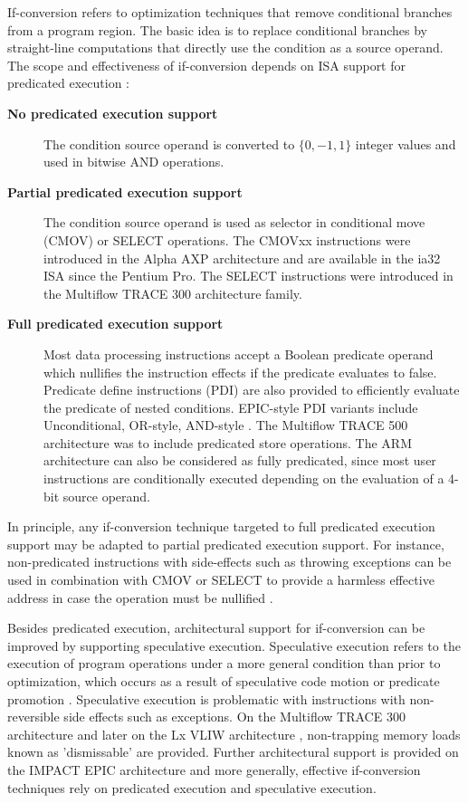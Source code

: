 If-conversion refers to optimization techniques that remove conditional branches
from a program region. The basic idea is to replace conditional branches by
straight-line computations that directly use the condition as a source operand.
The scope and effectiveness of if-conversion depends on ISA support for predicated
execution \cite{Mahlke:1995:ISCA}: \begin{description}
\item[\bf No predicated execution support] The condition source operand is converted
to $\{0, -1, 1\}$ integer values and used in bitwise AND operations.
\item[\bf Partial predicated execution support] The condition source operand is used
as selector in conditional move (CMOV) or SELECT operations. The CMOVxx
instructions were introduced in the Alpha AXP architecture
\cite{Blickstein:1992:DTJ} and are available in the ia32 ISA since the Pentium Pro.
The SELECT instructions were introduced in the Multiflow TRACE 300 architecture
family.
\item[\bf Full predicated execution support] Most data processing instructions
accept a Boolean predicate operand which nullifies the instruction effects if the
predicate evaluates to false. Predicate define instructions (PDI) are also
provided to efficiently evaluate the predicate of nested conditions. EPIC-style PDI
variants include Unconditional, OR-style, AND-style \cite{Mahlke:1995:ISCA}.
The Multiflow TRACE 500 architecture was to include predicated store operations.
The ARM architecture can also be considered as fully predicated, since most user
instructions are conditionally executed depending on the evaluation of a 4-bit
source operand.
\end{description} In principle, any if-conversion technique targeted to full
predicated execution support may be adapted to partial predicated execution
support. For instance, non-predicated instructions with side-effects such as
throwing exceptions can be used in combination with CMOV or SELECT to provide a
harmless effective address in case the operation must be nullified
\cite{Mahlke:1995:ISCA}.

Besides predicated execution, architectural support for if-conversion can be
improved by supporting speculative execution. Speculative execution refers to
the execution of program operations under a more general condition than prior to
optimization, which occurs as a result of speculative code motion
\cite{Lowney:1992:JS} or predicate promotion \cite{Mahlke:1995:ISCA}.
Speculative execution is problematic with instructions with non-reversible side
effects such as exceptions. On the Multiflow TRACE 300 architecture and later on
the Lx VLIW architecture \cite{Faraboschi:2000:ISCA}, non-trapping memory loads
known as 'dismissable' are provided. Further architectural support is provided
on the IMPACT EPIC architecture \cite{August:1998:ISCA} and more generally,
effective if-conversion techniques rely on predicated execution and speculative
execution.

